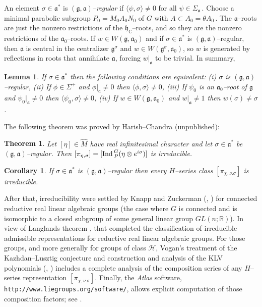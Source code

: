 \documentclass{conm-p-l}
\newtheorem{theorem}[equation]{Theorem}
\newtheorem{lemma}[equation]{Lemma}
\newtheorem{corollary}[equation]{Corollary}
\renewcommand{\gg}{\mathfrak{g}}
\def\ga{\mathfrak{a}}
\def\gg{\mathfrak{g}}
\def\gh{\mathfrak{h}}
\def\Ind{{\rm Ind\,}}
\def\C{\mathbb{C}}
\def\R{\mathbb{R}}
\def\cH{\mathcal{H}}
\begin{document}
An element $\sigma \in \ga^*$ is $(\gg,\ga)$--{\em regular} if
$\langle\psi,\sigma\rangle \ne 0$ for all $\psi \in \Sigma_\ga$\,.
Choose a minimal parabolic subgroup $P_0 = M_0A_0N_0$ of $G$ with 
$A \subset A_0 = \theta A_0$\,.  The $\ga$--roots are just the
nonzero restrictions of the $\gh_\C$--roots, and so they are the
nonzero restrictions of the $\ga_0$--roots.  If $w \in W(\gg,\ga_0)$ and if
$\sigma \in \ga^*$ is $(\gg,\ga)$--regular, then $\ga$ is central in
the centralizer $\gg^\sigma$ and $w \in W(\gg^\sigma,\ga_0)$, so $w$
is generated by reflections in roots that annihilate $\ga$, forcing
$w|_\ga$ to be trivial.  In summary,
\begin{lemma}\label{4.5.1} If $\sigma \in \ga^*$ then the following
conditions are equivalent:
{\rm (i)} $\sigma$ is $(\gg,\ga)$--regular,
{\rm (ii)} If $\phi \in \Sigma^+$ and $\phi|_\ga \ne 0$ then
	$\langle\phi,\sigma\rangle \ne 0$,
{\rm (iii)} If $\psi_0$ is an $\ga_0$--root of $\gg$ and $\psi_0|_\ga 
\ne 0$ then
        $\langle\psi_0,\sigma\rangle \ne 0$,
{\rm (iv)} If $w \in W(\gg,\ga_0)$ and $w|_\ga \ne 1$ then
	$w(\sigma)\ne\sigma$.
\end{lemma}

The following theorem was proved by Harish--Chandra (unpublished):
\begin{theorem} \label{4.5.2}
Let $[\eta]\in\widehat{M}$ have real infinitesimal
character and let $\sigma \in \ga^*$ be $(\gg,\ga)$--regular.  Then
$[\pi_{\eta,\sigma}] = [\Ind_P^G(\eta\otimes e^{i\sigma})]$ is
irreducible.
\end{theorem}
\begin{corollary} \label{4.5.3}
If $\sigma \in \ga^*$ is $(\gg,\ga)$--regular then every $H$--series
class $[\pi_{\chi,\nu.\sigma}]$ is irreducible.
\end{corollary}
After that, irreducibility were settled by Knapp and Zuckerman
(\cite{KZ1982a}, \cite{KZ1982b}) for connected reductive real
linear algebraic groups (the case where $G$ is connected and is isomorphic
to a closed subgroup of some general linear group $GL(n;\R)$).  In view of 
Langlands theorem \cite{L1973}, that completed the classification of 
irreducible 
admissible representations for reductive real linear algebraic groups.
For those groups, and more generally
for groups of class $\cH$, Vogan's treatment of the
Kazhdan--Lusztig conjecture and construction and analysis
of the KLV polynomials (\cite{V1983a}, \cite{V1983b}) includes a complete
analysis of the composition series of any $H$--series representation
$[\pi_{\chi,\nu.\sigma}]$.  Finally, the {\em Atlas} software,
{\tt http://www.liegroups.org/software/}, allows explicit computation
of those composition factors; see \cite{ALTV2015}.
\end{document}
